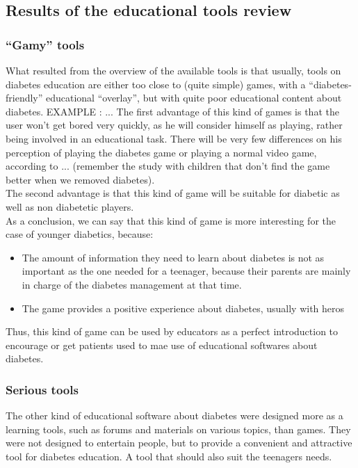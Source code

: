 \documentclass[12pt,MSc]{muthesis}
\begin{document}
\subsection{Results of the educational tools review}
\label{sec:resultsOfToolReview}
\subsubsection{``Gamy'' tools}
What resulted from the overview of the available tools is that usually, tools on diabetes education are either too close to (quite simple) games, with a ``diabetes-friendly'' educational ``overlay'', but with quite poor educational content about diabetes. EXAMPLE : ...
The first advantage of this kind of games is that the user won't get bored very quickly, as he will consider himself as playing, rather being involved in an educational task. There will be very few differences on his perception of playing the diabetes game or playing a normal video game, according to ... (remember the study with children that don't find the game better when we removed diabetes).\\

The second advantage is that this kind of game will be suitable for diabetic as well as non diabetetic players.\\
As a conclusion, we can say that this kind of game is more interesting for the case of younger diabetics, because:
\begin{itemize}
\item The amount of information they need to learn about diabetes is not as important as the one needed for a teenager, because their parents are mainly in charge of the diabetes management at that time.
\item The game provides a positive experience about diabetes, usually with heros
\end{itemize}

Thus, this kind of game can be used by educators as a perfect introduction to encourage or get patients used to mae use of educational softwares about diabetes.

\subsubsection{Serious tools}
The other kind of educational software about diabetes were designed more as a learning tools, such as forums and materials on various topics, than games. They were not designed to entertain people, but to provide a convenient and attractive tool for diabetes education. A tool that should also suit the teenagers needs.\\
\end{document}
